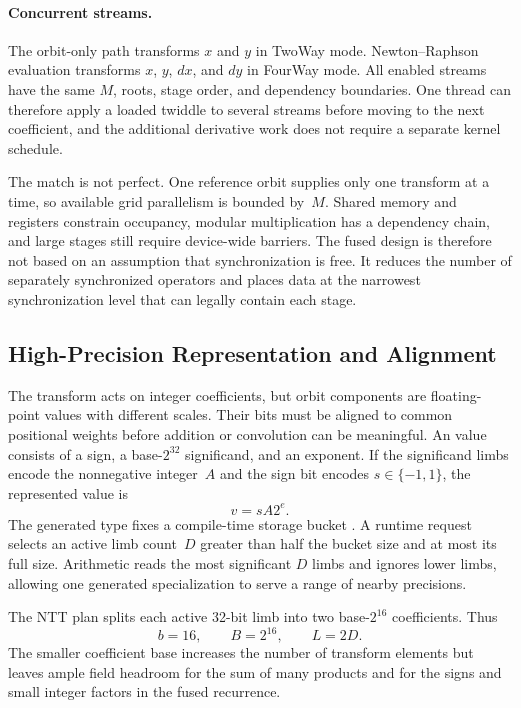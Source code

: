 \paragraph{Concurrent streams.}
The orbit-only path transforms $x$ and $y$ in TwoWay mode.  Newton--Raphson
evaluation transforms $x$, $y$, $dx$, and $dy$ in FourWay mode.  All enabled
streams have the same $M$, roots, stage order, and dependency boundaries.
One thread can therefore apply a loaded twiddle to several streams before
moving to the next coefficient, and the additional derivative work does not
require a separate kernel schedule.

The match is not perfect.  One reference orbit supplies only one transform at
a time, so available grid parallelism is bounded by~$M$.  Shared memory and
registers constrain occupancy, modular multiplication has a dependency chain,
and large stages still require device-wide barriers.  The fused design is
therefore not based on an assumption that synchronization is free.  It reduces
the number of separately synchronized operators and places data at the
narrowest synchronization level that can legally contain each stage.

\subsection{High-Precision Representation and Alignment}
\label{subsec:hpfloat-model}

The transform acts on integer coefficients, but orbit components are
floating-point values with different scales.  Their bits must be aligned to
common positional weights before addition or convolution can be meaningful.
An  value consists of a sign, a base-$2^{32}$ significand,
and an exponent.  If the significand limbs encode the nonnegative integer~$A$
and the sign bit encodes $s\in\{-1,1\}$, the represented value is
\begin{equation}
  v=sA2^e.
  \label{eq:hp-shark-value}
\end{equation}
The generated type fixes a compile-time storage bucket
.  A runtime request selects an active limb count~$D$
greater than half the bucket size and at most its full size.  Arithmetic reads
the most significant $D$ limbs and ignores lower limbs, allowing one generated
specialization to serve a range of nearby precisions.

The NTT plan splits each active 32-bit limb into two base-$2^{16}$
coefficients.  Thus
\begin{equation}
  b=16,
  \qquad
  B=2^{16},
  \qquad
  L=2D.
  \label{eq:reference-b16-plan}
\end{equation}
The smaller coefficient base increases the number of transform elements but
leaves ample field headroom for the sum of many products and for the signs and
small integer factors in the fused recurrence.

